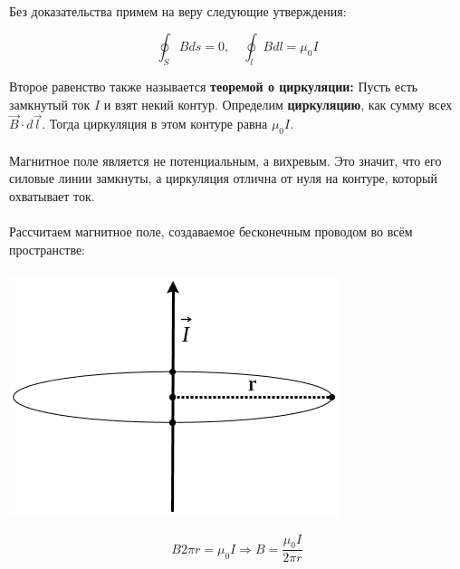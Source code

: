 \documentclass[dvipdfmx]{article}
\begin{document}
\paragraph{}

Без доказательства примем на веру следующие утверждения:

\begin{equation*}
  \oint_SBds = 0, \quad \oint_lBdl = \mu_0I
\end{equation*}

Второе равенство также называется \textbf{теоремой о циркуляции:} Пусть есть замкнутый ток $I$ и взят некий контур.
Определим \textbf{циркуляцию}, как сумму всех $\vec{B}\cdot d\vec{l}$. Тогда циркуляция в этом контуре равна $\mu_0I$.

\paragraph{}

Магнитное поле является не потенциальным, а вихревым. Это значит, что его силовые линии замкнуты,
а циркуляция отлична от нуля на контуре, который охватывает ток.

\paragraph{}

Рассчитаем магнитное поле, создаваемое бесконечным проводом во всём пространстве:
\paragraph{}
\begin{minipage}{0.4\linewidth}
  \includegraphics[width=\linewidth,natwidth=364,natheight=266]{images/4.png}
\end{minipage}
\begin{minipage}{0.5\linewidth}
  \begin{equation*}
    B2\pi r = \mu_0I \Rightarrow B = \frac{\mu_0I}{2\pi r}
  \end{equation*}
\end{minipage}
\end{document}
